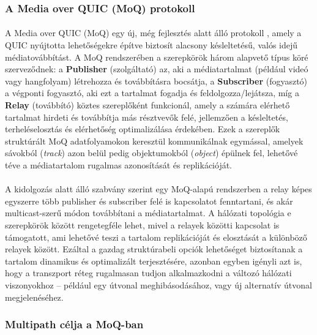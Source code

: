 \documentclass[a4paper,oneside]{article}
\begin{document}
\subsubsection{A Media over QUIC (MoQ) protokoll}
\paragraph{}

A Media over QUIC (MoQ) egy új, még fejlesztés alatt álló protokoll \cite{moq_draft}, 
amely a QUIC nyújtotta lehetőségekre építve biztosít alacsony késleltetésű, 
valós idejű médiatovábbítást. A MoQ rendszerében a szerepkörök három alapvető 
típus köré szerveződnek: a \textbf{Publisher} (szolgáltató) az, aki a médiatartalmat (például 
videó vagy hangfolyam) létrehozza és továbbításra bocsátja, a \textbf{Subscriber} (fogyasztó)
a végponti fogyasztó, aki ezt a tartalmat fogadja és feldolgozza/lejátsza, míg a \textbf{Relay} (továbbító)
köztes szereplőként funkcionál, amely a számára elérhető tartalmat hirdeti és 
továbbítja más résztvevők felé, jellemzően a késleltetés, terheléselosztás 
és elérhetőség optimalizálása érdekében. 
Ezek a szereplők struktúrált MoQ adatfolyamokon keresztül kommunikálnak egymással, amelyek sávokból
(\emph{track}) azon belül pedig objektumokból (\emph{object}) épülnek 
fel, lehetővé téve a médiatartalom rugalmas azonosítását és replikációját.

\paragraph{}
A kidolgozás alatt álló szabvány szerint egy MoQ-alapú rendszerben a relay képes 
egyszerre több publisher és subscriber felé is kapcsolatot fenntartani, 
és akár multicast-szerű módon továbbítani a médiatartalmat. 
A hálózati topológia e szerepkörök között rengetegféle lehet, mivel 
a relayek közötti kapcsolat is támogatott, ami lehetővé teszi
a tartalom replikációját és elosztását a különböző relayek között. 
Ezáltal a gazdag struktúrabeli opciók lehetőséget biztosítanak a tartalom dinamikus 
és optimalizált terjesztésére, azonban egyben igényli azt is, hogy a transzport 
réteg rugalmasan tudjon alkalmazkodni a változó hálózati viszonyokhoz – például 
egy útvonal meghibásodásához, vagy új alternatív útvonal megjelenéséhez.

\subsubsection{Multipath célja a MoQ-ban}
\end{document}
